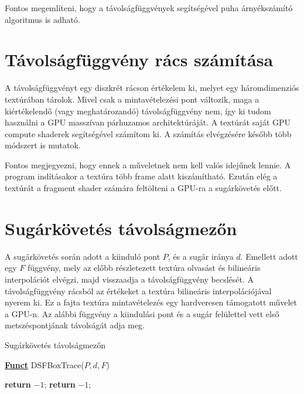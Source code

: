 Fontos megemlíteni, hogy a távolságfüggvények segítségével puha árnyékszámító algoritmus is adható. \cite{AreaLights}


\section{Távolságfüggvény rács számítása}

A távolságfüggvényt egy diszkrét rácson értékelem ki, melyet egy háromdimenziós textúrában tárolok. Mivel csak a mintavételezési pont változik, maga a kiértékelendő (vagy meghatározandó) távolságfüggvény nem, így ki tudom használni a GPU masszívan párhuzamos architektúráját. A textúrát saját GPU compute shaderek segítségével számítom ki. A számítás elvégzésére később több módszert is mutatok. 

Fontos megjegyezni, hogy ennek a műveletnek nem kell valós idejűnek lennie. A program indításakor a textúra több frame alatt kiszámítható. Ezután elég a textúrát a fragment shader számára feltölteni a GPU-ra a sugárkövetés előtt.


\section{Sugárkövetés távolságmezőn}

A sugárkövetés során adott a kiinduló pont $P$, és a sugár iránya $d$. Emellett adott egy $F$ függvény, mely az előbb részletezett textúra olvasást és bilineáris interpolációt elvégzi, majd visszaadja a távolságfüggvény becslését. A távolságfüggvény rácsból az értékeket a textúra bilineáris interpolációjával nyerem ki. Ez a fajta textúra mintavételezés egy hardveresen támogatott művelet a GPU-n. Az alábbi függvény a kiindulási pont és a sugár felülettel vett első metszéspontjának távolságát adja meg.

\begin{algorithm}[H]
	\caption{Sugárkövetés távolságmezőn}
	\label{alg:ibb}
	\textbf{\underline{Funct}} DSFBoxTrace($P,d,F$)
	\begin{algorithmic}[1] %
		 
		\EndIf
		 
		\EndIf
		                     
		 
		\EndIf
		\State \textbf{return} $-1$; 
		\EndIf
		\EndFor
		\State \textbf{return} $-1$; 
	\end{algorithmic}
\end{algorithm}


